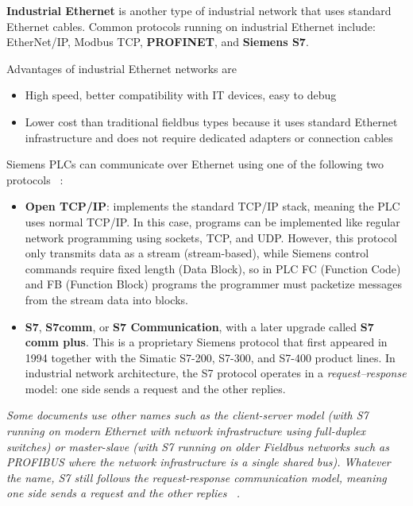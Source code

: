\documentclass[../main.tex]{subfiles}
\begin{document}
\textbf{Industrial Ethernet} is another type of industrial network that uses standard Ethernet cables. Common protocols running on industrial Ethernet include: EtherNet/IP, Modbus TCP, \textbf{PROFINET}, and \textbf{Siemens S7}. 

Advantages of industrial Ethernet networks are

\begin{itemize}
    \item High speed, better compatibility with IT devices, easy to debug
    \item Lower cost than traditional fieldbus types because it uses standard Ethernet infrastructure and does not require dedicated adapters or connection cables
\end{itemize}

Siemens PLCs can communicate over Ethernet using one of the following two protocols ~\cite{snap7_s7protocol}:

\begin{itemize}
    \item \textbf{Open TCP/IP}: implements the standard TCP/IP stack, meaning the PLC uses normal TCP/IP. In this case, programs can be implemented like regular network programming using sockets, TCP, and UDP. However, this protocol only transmits data as a stream (stream-based), while Siemens control commands require fixed length (Data Block), so in PLC FC (Function Code) and FB (Function Block) programs the programmer must packetize messages from the stream data into blocks.

    \item \textbf{S7}, \textbf{S7comm}, or \textbf{S7 Communication}, with a later upgrade called \textbf{S7 comm plus}. This is a proprietary Siemens protocol that first appeared in 1994 together with the Simatic S7-200, S7-300, and S7-400 product lines. In industrial network architecture, the S7 protocol operates in a \textit{request--response} model: one side sends a request and the other replies.
\end{itemize}

\textit{Some documents use other names such as the client-server model (with S7 running on modern Ethernet with network infrastructure using full-duplex switches) or master-slave (with S7 running on older Fieldbus networks such as PROFIBUS where the network infrastructure is a single shared bus). Whatever the name, S7 still follows the request-response communication model, meaning one side sends a request and the other replies ~\cite{inprotech_s7comm_security}.}
\end{document}
